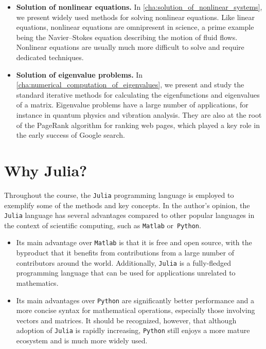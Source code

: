 \begin{itemize}
    \item
        \textbf{Solution of nonlinear equations.}
        In \cref{cha:solution_of_nonlinear_systems},
        we present widely used methods for solving nonlinear equations.
        Like linear equations, nonlinear equations are omnipresent in science,
        a prime example being the Navier--Stokes equation describing the motion of fluid flows.
        Nonlinear equations are usually much more difficult to solve and require dedicated techniques.

    \item
        \textbf{Solution of eigenvalue problems.}
        In \cref{cha:numerical_computation_of_eigenvalues},
        we present and study the standard iterative methods for calculating the eigenfunctions and eigenvalues of a matrix.
        Eigenvalue problems have a large number of applications,
        for instance in quantum physics and vibration analysis.
        They are also at the root of the PageRank algorithm for ranking web pages,
        which played a key role in the early success of Google search.

\end{itemize}


\section*{Why Julia?}%
\label{sec:why_julia_}

Throughout the course, the \texttt{Julia} programming language is employed to exemplify some of the methods and key concepts.
In the author's opinion,
the \texttt{Julia} language has several advantages compared to other popular languages in the context of scientific computing,
such as \texttt{Matlab} or~\texttt{Python}.
%
\begin{itemize}
    \item
        Its main advantage over \texttt{Matlab} is that it is free and open source,
        with the byproduct that it benefits from contributions from a large number of contributors around the world.
        Additionally, \texttt{Julia} is a fully-fledged programming language that can be used for applications unrelated to mathematics.

    \item
        Its main advantages over \texttt{Python} are significantly better performance and a more concise syntax for mathematical operations,
        especially those involving vectors and matrices.
        It should be recognized, however, that although adoption of \texttt{Julia} is rapidly increasing,
        \texttt{Python} still enjoys a more mature ecosystem and is much more widely used.
\end{itemize}
